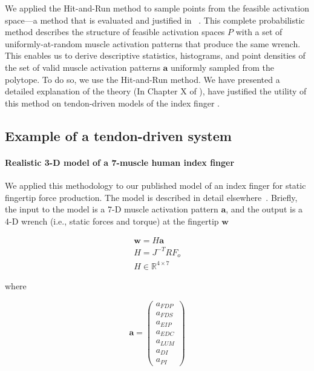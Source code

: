 \documentclass[9pt,twocolumn,twoside,lineno]{pnas-new}
\begin{document}
{We applied the Hit-and-Run method to sample points from the feasible activation space—a method that is evaluated and justified in ~\cite{valero-cuevas2015fundamentals, YYY_IEEE_STR}.
This complete probabilistic method describes the structure of feasible activation spaces $P$ with a set of uniformly-at-random muscle activation patterns that produce the same wrench. This enables us to derive descriptive statistics, histograms, and point densities of the set of valid muscle activation patterns $\textbf{a}$ uniformly sampled from the polytope. To do so, we use the Hit-and-Run method. We have presented a detailed explanation of the theory (In Chapter X of \cite{YYY_FUNDAMENTALS_BOOK}), have justified the utility of this method on tendon-driven models of the index finger \cite{YYY_IEEE_STR}.

\subsection*{Example of a tendon-driven system}
\paragraph*{Realistic 3-D model of a 7-muscle human index finger}
\label{ss:finger}
We applied this methodology to our published model of an index finger for static fingertip force production.
The model is described in detail elsewhere~\cite{valero-cuevas2009computational}.
Briefly, the input to the model is a 7-D muscle activation pattern $\textbf{a}$, and the output is a 4-D wrench (i.e., static forces and torque) at the fingertip $\textbf{w}$

\begin{eqnarray}
\textbf{w} = H \textbf{a} \\
H=J^{-T}RF_o \\
H \in \mathbb{R}^{4 \times 7}
\end{eqnarray}

where

\begin{equation}
\label{eq:a}
\textbf{a}=
\begin{pmatrix}
a_{FDP}\\
a_{FDS}\\
a_{EIP}\\
a_{EDC}\\
a_{LUM}\\
a_{DI}\\
a_{PI}
\end{pmatrix}
\end{equation}

}
\end{document}
